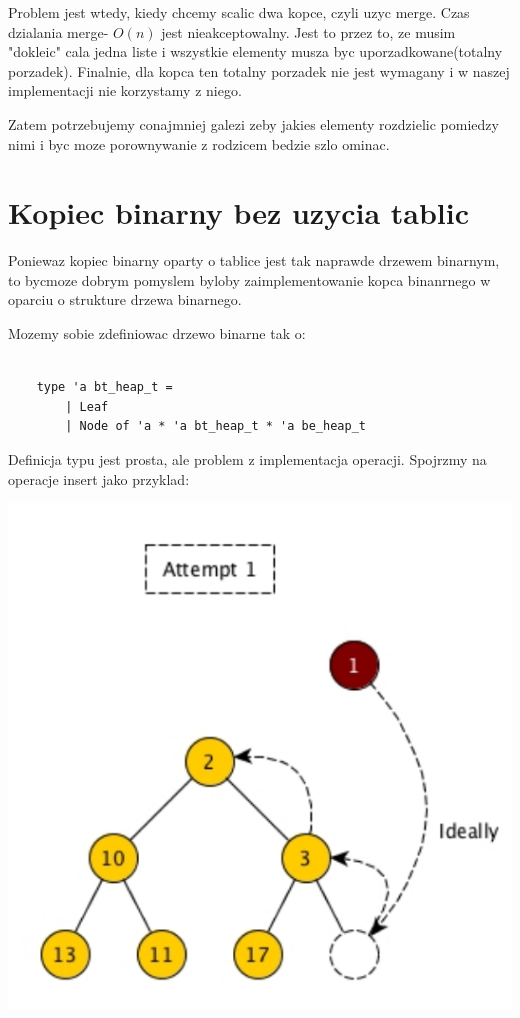 \documentclass{article}
\begin{document}
Problem jest wtedy, kiedy chcemy scalic dwa kopce, czyli uzyc merge. Czas dzialania merge- $O(n)$ jest nieakceptowalny. Jest to przez to, ze musim "dokleic" cala jedna liste i wszystkie elementy musza byc uporzadkowane(totalny porzadek). Finalnie, dla kopca ten totalny porzadek nie jest wymagany i w naszej implementacji nie korzystamy z niego.

Zatem potrzebujemy conajmniej galezi zeby jakies elementy rozdzielic pomiedzy nimi i byc moze porownywanie z rodzicem bedzie szlo ominac.

\section{Kopiec binarny bez uzycia tablic}

Poniewaz kopiec binarny oparty o tablice jest tak naprawde drzewem binarnym, to bycmoze dobrym pomyslem byloby zaimplementowanie kopca binanrnego w oparciu o strukture drzewa binarnego.

Mozemy sobie zdefiniowac drzewo binarne tak o:

\begin{lstlisting}
    
    type 'a bt_heap_t = 
        | Leaf
        | Node of 'a * 'a bt_heap_t * 'a be_heap_t

\end{lstlisting}

Definicja typu jest prosta, ale problem z implementacja operacji. Spojrzmy na operacje insert jako przyklad:


\begin{center}
    \begin{minipage}[h]{0.8\textwidth}
        \centering
        \includegraphics[width=1.0\textwidth]{insert_fst.png}
    \end{minipage}    
\end{center}
\end{document}
